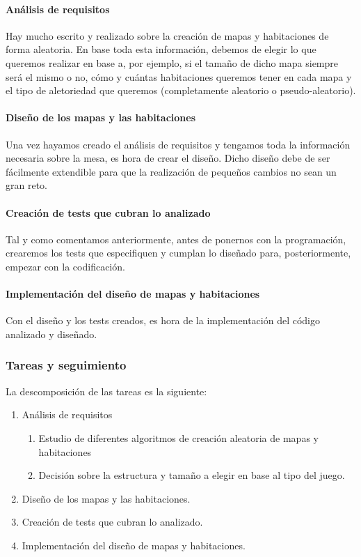 \paragraph{Análisis de requisitos} Hay mucho escrito y realizado sobre la creación de mapas y habitaciones de forma aleatoria. En base toda esta información, debemos de elegir lo que queremos realizar en base a, por ejemplo, si el tamaño de dicho mapa siempre será el mismo o no, cómo y cuántas habitaciones queremos tener en cada mapa y el tipo de aletoriedad que queremos (completamente aleatorio o pseudo-aleatorio).

\paragraph{Diseño de los mapas y las habitaciones} Una vez hayamos creado el análisis de requisitos y tengamos toda la información necesaria sobre la mesa, es hora de crear el diseño. Dicho diseño debe de ser fácilmente extendible para que la realización de pequeños cambios no sean un gran reto.

\paragraph{Creación de tests que cubran lo analizado} Tal y como comentamos anteriormente, antes de ponernos con la programación, crearemos los tests que especifiquen y cumplan lo diseñado para, posteriormente, empezar con la codificación.

\paragraph{Implementación del diseño de mapas y habitaciones} Con el diseño y los tests creados, es hora de la implementación del código analizado y diseñado.

\subsubsection{Tareas y seguimiento}

La descomposición de las tareas es la siguiente:

\begin{enumerate}[label=\bfseries WBS 2.\arabic*]
  \item Análisis de requisitos
    \begin{enumerate}[label=\bfseries WBS 2.1.\arabic*]
      \item Estudio de diferentes algoritmos de creación aleatoria de mapas y habitaciones
      \item Decisión sobre la estructura y tamaño a elegir en base al tipo del juego.
    \end{enumerate}
  \item Diseño de los mapas y las habitaciones.
  \item Creación de tests que cubran lo analizado.
  \item Implementación del diseño de mapas y habitaciones.
\end{enumerate}

